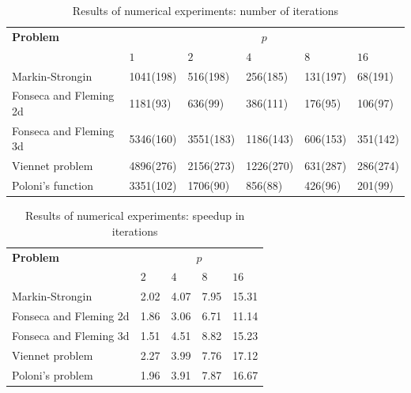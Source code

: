\documentclass{llncs}
\begin{document}
\begin{table}
  \centering
  \caption{Results of numerical experiments: number of iterations}
  \label{tab:exResultsIters}
  \begin{tabular}{|l|K{1.7cm}|K{1.7cm}|K{1.7cm}|K{1.7cm}|K{1.7cm}|}
\hline
\textbf{Problem} & \\
  & \(1\) & \(2\) & \(4\) & \(8\) & \(16\)\\
\hline
Markin-Strongin & 1041(198) & 516(198) & 256(185) & 131(197) & 68(191) \\
\hline
Fonseca and Fleming 2d & 1181(93) & 636(99) & 386(111) & 176(95) & 106(97) \\
\hline
Fonseca and Fleming 3d & 5346(160) & 3551(183) & 1186(143) & 606(153) & 351(142) \\
\hline
Viennet problem & 4896(276) & 2156(273) & 1226(270) & 631(287) & 286(274)\\
\hline
Poloni's function & 3351(102) & 1706(90) & 856(88) & 426(96) & 201(99) \\
\hline
\end{tabular}
\end{table}

\begin{table}
  \centering
  \caption{Results of numerical experiments: speedup in iterations}
  \label{tab:exResultsItersSpeedup}
  \begin{tabular}{|l|K{1.5cm}|K{1.5cm}|K{1.5cm}|K{1.5cm}|}
\hline
\textbf{Problem} & \\
  & \(2\) & \(4\) & \(8\) & \(16\)\\
\hline
Markin-Strongin & 2.02 & 4.07 & 7.95 & 15.31 \\
\hline
Fonseca and Fleming 2d & 1.86 & 3.06 & 6.71 & 11.14 \\
\hline
Fonseca and Fleming 3d & 1.51 & 4.51 & 8.82 & 15.23 \\
\hline
Viennet problem & 2.27 & 3.99 & 7.76 & 17.12\\
\hline
Poloni's problem & 1.96 & 3.91 & 7.87 & 16.67 \\
\hline
\end{tabular}
\end{table}
\end{document}
